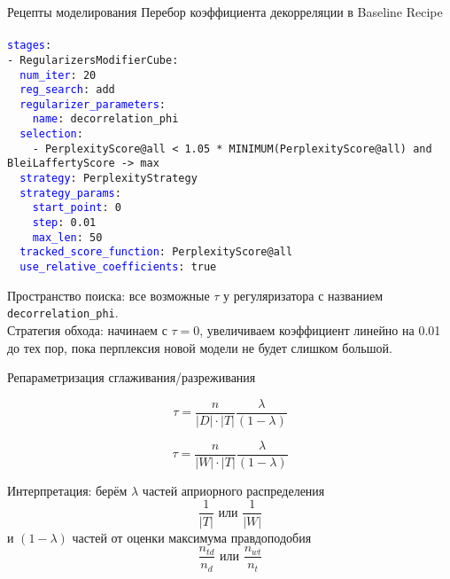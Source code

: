 \begin{frame}[t]{Рецепты моделирования}
Перебор коэффициента декорреляции в Baseline Recipe\\

\footnotesize \texttt{\\
\textcolor{blue}{stages}: \\
- RegularizersModifierCube: \\
\ \ \textcolor{blue}{num\_iter}: 20 \\
\ \ \textcolor{blue}{reg\_search}: add \\
\ \ \textcolor{blue}{regularizer\_parameters}: \\
\ \ \ \ \textcolor{blue}{name}: decorrelation\_phi \\
\ \ \textcolor{blue}{selection}: \\
\ \ \ \ - PerplexityScore@all < 1.05 * MINIMUM(PerplexityScore@all) and BleiLaffertyScore -> max \\
\ \ \textcolor{blue}{strategy}: PerplexityStrategy \\
\ \ \textcolor{blue}{strategy\_params}: \\
\ \ \ \ \textcolor{blue}{start\_point}: 0 \\
\ \ \ \ \textcolor{blue}{step}: 0.01 \\
\ \ \ \ \textcolor{blue}{max\_len}: 50 \\
\ \ \textcolor{blue}{tracked\_score\_function}: PerplexityScore@all \\
\ \ \textcolor{blue}{use\_relative\_coefficients}: true	\\
}

Пространство поиска: все возможные $\tau$ у регуляризатора с названием \texttt{decorrelation\_phi}.\\

Стратегия обхода: начинаем с $\tau=0$, увеличиваем коэффициент линейно на 0.01 до тех пор, пока перплексия новой модели не будет слишком большой.
\end{frame}




\begin{frame}{Репараметризация сглаживания/разреживания}
	
\begin{equation}
\tau = \frac{n}{|D| \cdot |T|} \frac{\lambda}{(1-\lambda)}
\end{equation}

\begin{equation}
\tau = \frac{n}{|W|\cdot|T|} \frac{\lambda}{(1-\lambda)}  
\end{equation}

Интерпретация: берём $\lambda$ частей априорного распределения
\[
\frac{1}{|T|}\text{ или }\frac{1}{|W|}
\]
и $(1-\lambda)$ частей от оценки максимума правдоподобия 
\[
\frac{n_{td}}{n_d}\text{ или }\frac{n_{wt}}{n_t}
\]

\end{frame}
